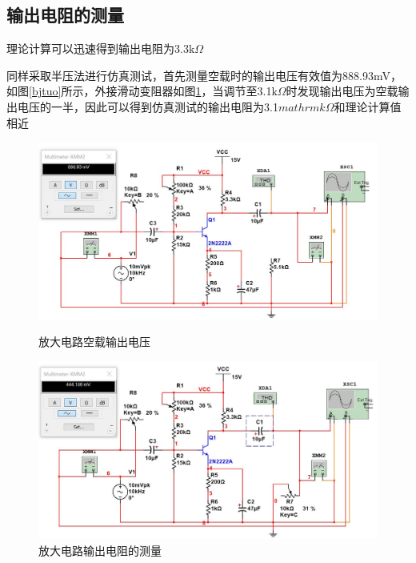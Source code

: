 \documentclass[UTF8,a4paper]{ctexart}
\begin{document}
\subsection{输出电阻的测量}
理论计算可以迅速得到输出电阻为$3.3\mathrm{k}\Omega$

同样采取半压法进行仿真测试，首先测量空载时的输出电压有效值为888.93mV，如图\ref{bjtuo}所示，外接滑动变阻器如图\ref{bjtro}，当调节至3.1$\mathrm{k}\Omega$时发现输出电压为空载输出电压的一半，因此可以得到仿真测试的输出电阻为3.1$mathrm{k}\Omega$和理论计算值相近
\begin{figure}
\centering
\includegraphics[width=\textwidth]{1-2Uo.jpg}
\caption{放大电路空载输出电压}
\label{bjtuo}
\includegraphics[width=\textwidth]{1-2Ro.jpg}
\caption{放大电路输出电阻的测量}
\label{bjtro}
\end{figure}
\end{document}
